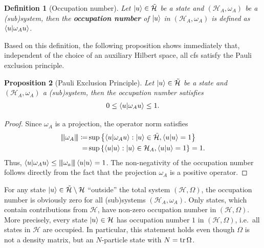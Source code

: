 \documentclass[reqno,11pt]{amsart}
\newcommand{\defeq}{\coloneqq}
\newcommand{\opnorm}[1]{
        {\left| \kern-0.25ex \left| \kern-0.25ex \left| #1 \right| \kern-0.25ex \right| \kern-0.25ex \right|}
}
\renewcommand{\H}{\mathcal{H}}
\newtheorem{definition}{Definition}[section]
\newtheorem{proposition}[definition]{Proposition}
\numberwithin{equation}{section}
\begin{document}
\begin{definition}[Occupation number]
    Let $\ket{u} \in \tilde{\H}$ be a state and $(\H_A, \omega_A)$ be a (sub)system, then the \textbf{occupation number} of $\ket{u}$ in $(\H_A, \omega_A)$ is defined as $\braket{u}{\omega_A u}$.
\end{definition}

Based on this definition, the following proposition shows immediately that, independent of the choice of an auxiliary Hilbert space, all \ac{cfs}
satisfy the Pauli exclusion principle.

\begin{proposition}[Pauli Exclusion Principle]
    Let $\ket{u} \in \tilde{\H}$ be a state and $(\H_A, \omega_A)$ a (sub)system, then the occupation number satisfies
    \begin{align}
        0 \leq \braket{u}{\omega_A u} \leq 1.
    \end{align}
\end{proposition}
\begin{proof}
    Since $\omega_A$ is a projection, the operator norm satisfies
    \begin{align}
        \opnorm{\omega_A} \defeq& \sup \left\{ \braket{u}{\omega_A u} : \ket{u} \in \tilde{\H}, \braket{u}{u} = 1 \right\} \nonumber \\
        =& \sup \left\{ \braket{u}{u} : \ket{u} \in \H_A, \braket{u}{u} = 1 \right\} = 1.
    \end{align}
    Thus, $\braket{u}{\omega_A u} \leq \opnorm{\omega_a} \braket{u}{u} = 1$.
    The non-negativity of the occupation number follows directly from the fact that the projection $\omega_A$ is a positive
    operator.
\end{proof}

For any state $\ket{u} \in \tilde{\H} \setminus \H$ ``outside'' the total system $(\H, \Omega)$,
the occupation number is obviously zero for all (sub)systems $(\H_A, \omega_A)$.
Only states, which contain contributions from $\H$, have non-zero occupation number in $(\H, \Omega)$.
More precisely, every state $\ket{u} \in \H$ has occupation number $1$ in $(\H, \Omega)$, i.e.~all states in $\H$ are occupied.
In particular, this statement holds even though $\Omega$ is not a density matrix, but an $N$-particle state with $N = \tr \Omega$.
\end{document}

